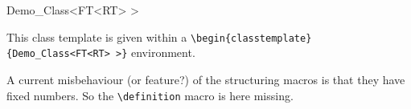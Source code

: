 \begin{classtemplate}{Demo_Class<FT<RT> >}

This class template is given within a
\verb"\begin{classtemplate}{Demo_Class<FT<RT> >}" environment.

\creation

A current misbehaviour (or feature?) of the structuring macros is that
they have fixed numbers. So the \verb"\definition" macro is here
missing.




\operations
\threecolumns{4.3cm}{2.3cm}



\end{classtemplate}

